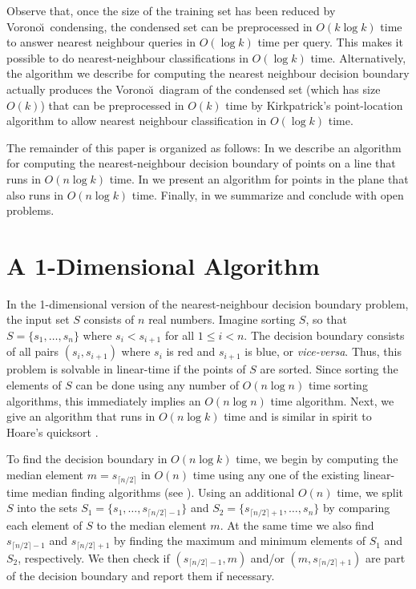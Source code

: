 \documentclass[lotsofwhite,charterfonts]{patmorin}
\newcommand{\voronoi}{Vorono\u\i}
\newcommand{\ceil}[1]{\lceil #1 \rceil}
\begin{document}
Observe that, once the size of the training set has been reduced by
\voronoi\ condensing, the condensed set can be preprocessed in $O(k\log
k)$ time to answer nearest neighbour queries in $O(\log k)$ time per
query.  This makes it possible to do nearest-neighbour classifications
in $O(\log k)$ time.  Alternatively, the algorithm we describe for
computing the nearest neighbour decision boundary actually produces
the \voronoi\ diagram of the condensed set (which has size $O(k)$)
that can be preprocessed in $O(k)$ time by Kirkpatrick's
point-location algorithm \cite{k83} to allow nearest neighbour
classification in $O(\log k)$ time.

The remainder of this paper is organized as follows: In 
we describe an algorithm for computing the nearest-neighbour decision
boundary of points on a line that runs in $O(n\log k)$ time.  In
 we present an algorithm for points in the plane that
also runs in $O(n\log k)$ time.  Finally, in  we
summarize and conclude with open problems.

\section{A 1-Dimensional Algorithm}

In the 1-dimensional version of the nearest-neighbour decision
boundary problem, the input set $S$ consists of $n$ real numbers.
Imagine sorting $S$, so that $S=\{s_1,\ldots,s_n\}$ where
$s_i<s_{i+1}$ for all $1\le i< n$.  The decision boundary consists of
all pairs $(s_i,s_{i+1})$ where $s_i$ is red and $s_{i+1}$ is blue, or
\emph{vice-versa}.  Thus, this problem is solvable in linear-time if
the points of $S$ are sorted.  Since sorting the elements of $S$ can
be done using any number of $O(n\log n)$ time sorting algorithms, this
immediately implies an $O(n\log n)$ time algorithm.  Next, we give an
algorithm that runs in $O(n\log k)$ time and is similar in spirit to
Hoare's quicksort \cite{h61}.

To find the decision boundary in $O(n\log k)$ time, we begin by
computing the median element $m=s_{\ceil{n/2}}$ in $O(n)$ time using
any one of the existing linear-time median finding algorithms (see
\cite{bfprt73}).  Using an additional $O(n)$ time, we split $S$ into
the sets $S_1=\{s_1,\ldots,s_{\ceil{n/2}-1}\}$ and
$S_2=\{s_{\ceil{n/2}+1},\ldots,s_n\}$ by comparing each element of $S$
to the median element $m$.  At the same time we also find
$s_{\ceil{n/2}-1}$ and $s_{\ceil{n/2}+1}$ by finding the maximum and
minimum elements of $S_1$ and $S_2$, respectively.  We then check if
$(s_{\ceil{n/2}-1},m)$ and/or $(m,s_{\ceil{n/2}+1})$ are part of the
decision boundary and report them if necessary.  
\end{document}
